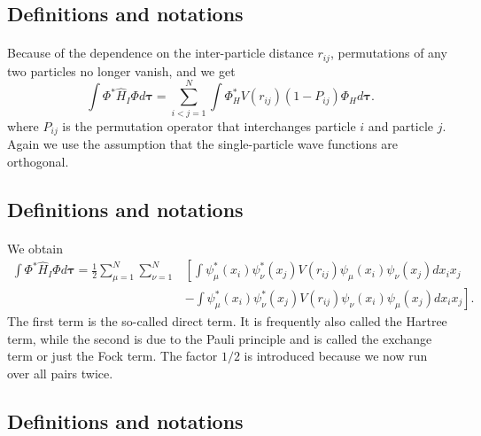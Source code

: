 \documentclass[%
twoside,                 %
final,                   %
10pt]{article}
\begin{document}
\subsection{Definitions and notations}

\paragraph{}
Because of the dependence on the inter-particle distance $r_{ij}$,  permutations of
any two particles no longer vanish, and we get
\[
  \int \Phi^*\hat{H}_I\Phi d\mathbf{\tau} 
  = \sum_{i < j=1}^N \int  
  \Phi_H^*V(r_{ij})(1-P_{ij})\Phi_H d\mathbf{\tau}.
\]
where $P_{ij}$ is the permutation operator that interchanges
particle $i$ and particle $j$. Again we use the assumption that the single-particle wave functions
are orthogonal.




\subsection{Definitions and notations}

\paragraph{}
We obtain
\begin{equation}
\begin{split}
  \int \Phi^*\hat{H}_I\Phi d\mathbf{\tau} 
  = \frac{1}{2}\sum_{\mu=1}^N\sum_{\nu=1}^N
    &\left[ \int \psi_{\mu}^*(x_i)\psi_{\nu}^*(x_j)V(r_{ij})\psi_{\mu}(x_i)\psi_{\nu}(x_j)
    dx_ix_j \right.\\
  &\left.
  - \int \psi_{\mu}^*(x_i)\psi_{\nu}^*(x_j)
  V(r_{ij})\psi_{\nu}(x_i)\psi_{\mu}(x_j)
  dx_ix_j
  \right]. \label{H2Expectation}
\end{split}
\end{equation}
The first term is the so-called direct term. It is frequently also called the  Hartree term, 
while the second is due to the Pauli principle and is called
the exchange term or just the Fock term.
The factor  $1/2$ is introduced because we now run over
all pairs twice.



\subsection{Definitions and notations}
\end{document}
